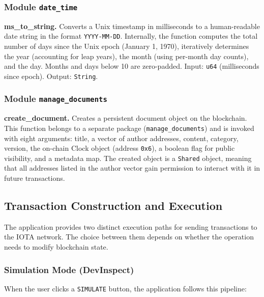 \documentclass[12pt,a4paper]{article}
\begin{document}
\subsubsection{Module \texttt{date\_time}}

\textbf{ms\_to\_string.} Converts a Unix timestamp in milliseconds to a human-readable date string in the format \texttt{YYYY-MM-DD}. Internally, the function computes the total number of days since the Unix epoch (January 1, 1970), iteratively determines the year (accounting for leap years), the month (using per-month day counts), and the day. Months and days below 10 are zero-padded. Input: \texttt{u64} (milliseconds since epoch). Output: \texttt{String}.

\subsubsection{Module \texttt{manage\_documents}}

\textbf{create\_document.} Creates a persistent document object on the blockchain. This function belongs to a separate package (\texttt{manage\_documents}) and is invoked with eight arguments: title, a vector of author addresses, content, category, version, the on-chain Clock object (address \texttt{0x6}), a boolean flag for public visibility, and a metadata map. The created object is a \texttt{Shared} object, meaning that all addresses listed in the author vector gain permission to interact with it in future transactions.

\subsection{Transaction Construction and Execution}

The application provides two distinct execution paths for sending transactions to the IOTA network. The choice between them depends on whether the operation needs to modify blockchain state.

\subsubsection{Simulation Mode (DevInspect)}

When the user clicks a \texttt{SIMULATE} button, the application follows this pipeline:
\end{document}
